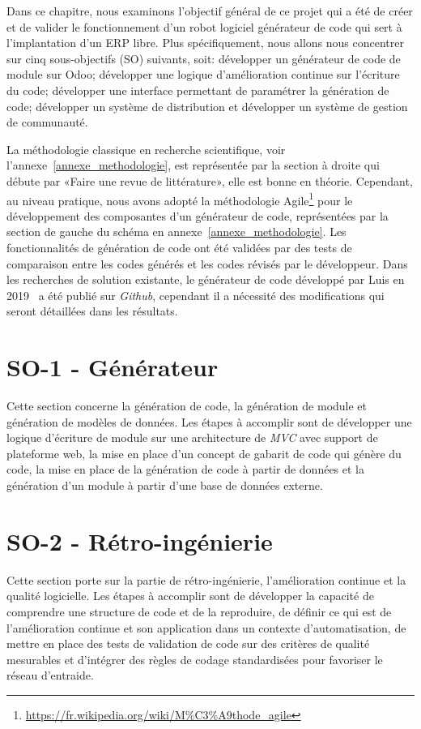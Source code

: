 \label{sec:Theme1} \label{chapitre_methode}
Dans ce chapitre, nous examinons l’objectif général de ce projet qui a été de créer et de valider le fonctionnement d’un robot logiciel générateur de code qui sert à l’implantation d’un ERP libre. Plus spécifiquement, nous allons nous concentrer sur cinq sous-objectifs (SO) suivants, soit: développer un générateur de code de module sur Odoo; développer une logique d'amélioration continue sur l'écriture du code; développer une interface permettant de paramétrer la génération de code;
développer un système de distribution et développer un système de gestion de communauté.

La méthodologie classique en recherche scientifique, voir l'annexe~\ref{annexe_methodologie}, est représentée par la section à droite qui débute par «Faire une revue de littérature», elle est bonne en théorie. Cependant, au niveau pratique, nous avons adopté la méthodologie Agile\footnote{\url{https://fr.wikipedia.org/wiki/M\%C3\%A9thode_agile}} pour le développement des composantes d'un générateur de code, représentées par la section de gauche du schéma en annexe~\ref{annexe_methodologie}. Les fonctionnalités de génération de code ont été validées par des tests de comparaison entre les codes générés et les codes révisés par le développeur. Dans les recherches de solution existante, le générateur de code développé par Luis en 2019~\cite{bluiksnot_repo} a été publié sur \textit{Github}, cependant il a nécessité des modifications qui seront détaillées dans les résultats. 

\section{SO-1 - Générateur}
Cette section concerne la génération de code, la génération de module et génération de modèles de données. Les étapes à accomplir sont de développer une logique d’écriture de module sur une architecture de \textit{MVC} avec support de plateforme web, la mise en place d’un concept de gabarit de code qui génère du code, la mise en place de la génération de code à partir de données et la génération d'un module à partir d’une base de données externe.

\section{SO-2 - Rétro-ingénierie}
Cette section porte sur la partie de rétro-ingénierie, l'amélioration continue et la qualité logicielle. Les étapes à accomplir sont de développer la capacité de comprendre une structure de code et de la reproduire, de définir ce qui est de l’amélioration continue et son application dans un contexte d’automatisation, de mettre en place des tests de validation de code sur des critères de qualité mesurables et d'intégrer des règles de codage standardisées pour favoriser le réseau d’entraide.

